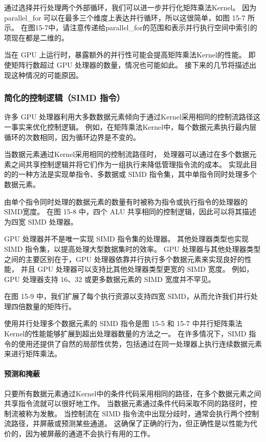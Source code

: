 通过选择并行处理两个外部循环，我们可以进一步并行化矩阵乘法Kernel。 
因为 parallel\_for 可以在最多三个维度上表达并行循环，所以这很简单，如图 15-7 所示。 
在图15-7中，请注意传递给parallel\_for的范围和表示并行执行空间中索引的项现在都是二维的。

当在 GPU 上运行时，暴露额外的并行性可能会提高矩阵乘法Kernel的性能。 
即使矩阵行数超过 GPU 处理器的数量，情况也可能如此。 接下来的几节将描述出现这种情况的可能原因。

\subsubsection{简化的控制逻辑（SIMD 指令）}
许多 GPU 处理器利用大多数数据元素倾向于通过Kernel采用相同的控制流路径这一事实来优化控制逻辑。 
例如，在矩阵乘法Kernel中，每个数据元素执行最内层循环的次数相同，因为循环边界是不变的。

当数据元素通过Kernel采用相同的控制流路径时，
处理器可以通过在多个数据元素之间共享控制逻辑并将它们作为一组执行来降低管理指令流的成本。 
实现此目的的一种方法是实现单指令、多数据或 SIMD 指令集，其中单指令同时处理多个数据元素。

由单个指令同时处理的数据元素的数量有时被称为指令或执行指令的处理器的SIMD宽度。 
在图 15-8 中，四个 ALU 共享相同的控制逻辑，因此可以将其描述为四宽 SIMD 处理器。

GPU 处理器并不是唯一实现 SIMD 指令集的处理器。 
其他处理器类型也实现 SIMD 指令集，以提高处理大型数据集时的效率。 
GPU 处理器与其他处理器类型之间的主要区别在于，GPU 处理器依靠并行执行多个数据元素来实现良好的性能，
并且 GPU 处理器可以支持比其他处理器类型更宽的 SIMD 宽度。 
例如，GPU 处理器支持 16、32 或更多数据元素的 SIMD 宽度并不罕见。

在图 15-9 中，我们扩展了每个执行资源以支持四宽 SIMD，从而允许我们并行处理四倍数量的矩阵行。

使用并行处理多个数据元素的 SIMD 指令是图 15-5 
和 15-7 中并行矩阵乘法Kernel的性能能够扩展到超出处理器数量的方法之一。 
在许多情况下，SIMD 指令的使用还提供了自然的局部性优势，包括通过在同一处理器上执行连续数据元素来进行矩阵乘法。

\paragraph{预测和掩蔽}

只要所有数据元素通过Kernel中的条件代码采用相同的路径，在多个数据元素之间共享指令流就可以很好地工作。 
当数据元素通过条件代码采取不同的路径时，控制流被称为发散。 
当控制流在 SIMD 指令流中出现分歧时，通常会执行两个控制流路径，并屏蔽或预测某些通道。 
这确保了正确的行为，但正确性是以性能为代价的，因为被屏蔽的通道不会执行有用的工作。


